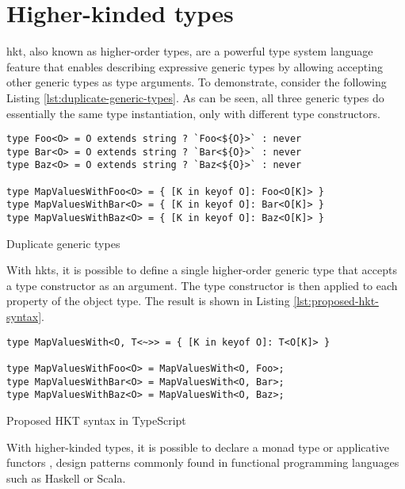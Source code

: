 \section{Higher-kinded types}\label{sec:higher-kinded-types}

\acrfull{hkt}, also known as higher-order types, are a powerful type system language feature that enables describing expressive generic types by allowing accepting other generic types as type arguments. To demonstrate, consider the following Listing \ref{lst:duplicate-generic-types}. As can be seen, all three generic types do essentially the same type instantiation, only with different type constructors.

\begin{listing}[ht]
  \begin{verbatim}
type Foo<O> = O extends string ? `Foo<${O}>` : never
type Bar<O> = O extends string ? `Bar<${O}>` : never
type Baz<O> = O extends string ? `Baz<${O}>` : never

type MapValuesWithFoo<O> = { [K in keyof O]: Foo<O[K]> }
type MapValuesWithBar<O> = { [K in keyof O]: Bar<O[K]> }
type MapValuesWithBaz<O> = { [K in keyof O]: Baz<O[K]> }
\end{verbatim}
  \caption{Duplicate generic types}\label{lst:duplicate-generic-types}
\end{listing}

With \acrshort{hkt}s, it is possible to define a single higher-order generic type that accepts a type constructor as an argument. The type constructor is then applied to each property of the object type. The result is shown in Listing \ref{lst:proposed-hkt-syntax}.

\begin{listing}[ht]
  \begin{verbatim}
type MapValuesWith<O, T<~>> = { [K in keyof O]: T<O[K]> }

type MapValuesWithFoo<O> = MapValuesWith<O, Foo>;
type MapValuesWithBar<O> = MapValuesWith<O, Bar>;
type MapValuesWithBaz<O> = MapValuesWith<O, Baz>;
\end{verbatim}
  \caption{Proposed HKT syntax in TypeScript}\label{lst:proposed-hkt-syntax}
\end{listing}

With higher-kinded types, it is possible to declare a monad type \cite{wadlerMonadsFunctionalProgramming1993} or applicative functors \cite{mcbrideApplicativeProgrammingEffects2008}, design patterns commonly found in functional programming languages such as Haskell or Scala.

